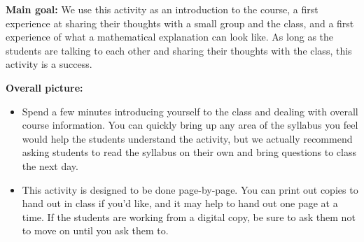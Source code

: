 \documentclass[noauthor,nooutcomes]{ximera}
\begin{document}
\begin{instructorNotes}


{\bf Main goal:} We use this activity as an introduction to the course, a first experience at sharing their thoughts with a small group and the class, and a first experience of what a mathematical explanation can look like. As long as the students are talking to each other and sharing their thoughts with the class, this activity is a success.

{\bf Overall picture:} 
\begin{itemize}
	\item Spend a few minutes introducing yourself to the class and dealing with overall course information. You can quickly bring up any area of the syllabus you feel would help the students understand the activity, but we actually recommend asking students to read the syllabus on their own and bring questions to class the next day.
	\item This activity is designed to be done page-by-page. You can print out copies to hand out in class if you'd like, and it may help to hand out one page at a time. If the students are working from a digital copy, be sure to ask them not to move on until you ask them to.
\end{itemize}
	

\end{instructorNotes}
\end{document}
